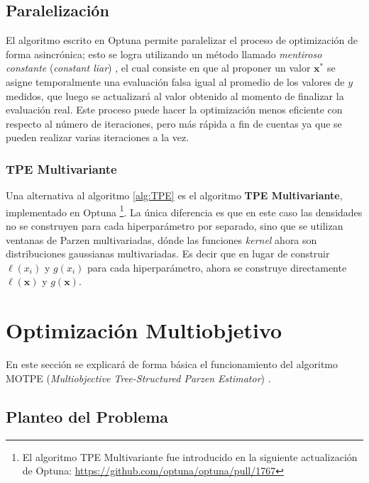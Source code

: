  
\subsection*{Paralelización}
 
El algoritmo escrito en Optuna permite paralelizar el proceso de optimización de forma asincrónica; esto se logra utilizando un método llamado \textit{mentiroso constante} (\textit{constant liar}) \cite{NIPS2011_86e8f7ab}, el cual consiste en que al proponer un valor $\textbf{x}^*$ se asigne temporalmente una evaluación falsa igual al promedio de los valores de $y$ medidos, que luego se actualizará al valor obtenido al momento de finalizar la evaluación real. Este proceso puede hacer la optimización menos eficiente con respecto al número de iteraciones, pero más rápida a fin de cuentas ya que se pueden realizar varias iteraciones a la vez.

 
\subsubsection*{TPE Multivariante} 

Una alternativa al algoritmo \ref{alg:TPE} es el algoritmo \textbf{TPE Multivariante}, implementado en Optuna \footnote{El algoritmo TPE Multivariante fue introducido en la siguiente actualización de Optuna: \url{https://github.com/optuna/optuna/pull/1767}}. La única diferencia es que en este caso las densidades no se construyen para cada hiperparámetro por separado, sino que se utilizan ventanas de Parzen multivariadas, dónde las funciones \textit{kernel} ahora son distribuciones gaussianas multivariadas. Es decir que en lugar de construir $\ell(x_i)$ y $g(x_i)$ para cada hiperparámetro, ahora se construye directamente $\ell(\textbf{x})$ y $g(\textbf{x})$.


\section{Optimización Multiobjetivo}

En este sección se explicará de forma básica el funcionamiento del algoritmo MOTPE (\textit{Multiobjective Tree-Structured Parzen Estimator}) \cite{10.1613/jair.1.13188, 10.1145/3377930.3389817}.%

\subsection{Planteo del Problema}

